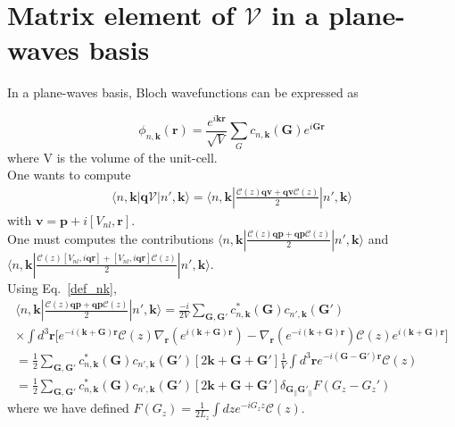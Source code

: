 \documentclass[a4paper,11pt]{report}
\renewcommand{\vec}[1]{\mathbf{#1}}
\newcommand{\bra}{\langle}
\newcommand{\ket}{\rangle}
\begin{document}
\chapter{Matrix element of $\mathcal{V}$ in a plane-waves basis}

In a plane-waves basis, Bloch wavefunctions can be expressed as

\begin{equation}
 \phi_{n,\vec{k}}(\vec{r}) = \frac{e^{i\vec{k}\vec{r}}}{\sqrt{V}} \sum_{G} c_{n,\vec{k}}(\vec{G})e^{i\vec{G}\vec{r}}
\label{def_nk}
\end{equation}
where V is the volume of the unit-cell.\\
One wants to compute
\begin{eqnarray}
 \bra n,\vec{k}|\vec{q}\vec{\mathcal{V}}|n',\vec{k}\ket = \bra n,\vec{k}|\frac{\mathcal{C}(z)\vec{q}\vec{v}+\vec{q}\vec{v}\mathcal{C}(z)}{2}|n',\vec{k}\ket
\end{eqnarray}
with $\vec{v}=\vec{p}+i[V_{nl},\vec{r}]$.\\
One must computes the contributions 
$\bra n,\vec{k}|\frac{\mathcal{C}(z)\vec{q}\vec{p}+\vec{q}\vec{p}\mathcal{C}(z)}{2}|n',\vec{k}\ket$ and
$\bra n,\vec{k}|\frac{\mathcal{C}(z)[V_{nl},i\vec{q}\vec{r}]+[V_{nl},i\vec{q}\vec{r}]\mathcal{C}(z)}{2}|n',\vec{k}\ket$. \\

Using Eq.~\ref{def_nk}, 
\begin{eqnarray}
 \bra n,\vec{k}|\frac{\mathcal{C}(z)\vec{q}\vec{p}+\vec{q}\vec{p}\mathcal{C}(z)}{2}|n',\vec{k}\ket = \frac{-i}{2V}\sum_{\vec{G},\vec{G'}} c^*_{n,\vec{k}}(\vec{G})c_{n',\vec{k}}(\vec{G'}) \nonumber\\
\times\int d^3\vec{r} \Bigg[e^{-i(\vec{k}+\vec{G})\vec{r}} \mathcal{C}(z) \nabla_{\vec{r}} (e^{i(\vec{k}+\vec{G})\vec{r}}) - \nabla_{\vec{r}} (e^{-i(\vec{k}+\vec{G})\vec{r}} ) \mathcal{C}(z) e^{i(\vec{k}+\vec{G})\vec{r}}\Bigg]\nonumber\\
 = \frac{1}{2}\sum_{\vec{G},\vec{G'}} c^*_{n,\vec{k}}(\vec{G})c_{n',\vec{k}}(\vec{G'}) \left[2\vec{k}+\vec{G}+\vec{G'} \right]\frac{1}{V}\int d^3\vec{r} e^{-i(\vec{G}-\vec{G'})\vec{r}} \mathcal{C}(z)\nonumber\\
 = \frac{1}{2}\sum_{\vec{G},\vec{G'}} c^*_{n,\vec{k}}(\vec{G})c_{n',\vec{k}}(\vec{G'}) \left[2\vec{k}+\vec{G}+\vec{G'} \right] \delta_{\vec{G}_{||}\vec{G'}_{||}} F(G_z-G_z')
\end{eqnarray}
where we have defined $F(G_z)=\frac{1}{2L_z}\int dz e^{-iG_z z} \mathcal{C}(z)$.\\
\end{document}
